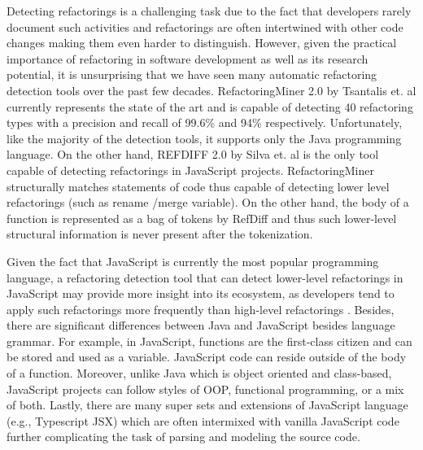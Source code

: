 \documentclass[letterpaper,12pt,onecolumn,final]{report}
\begin{document}
Detecting refactorings is a challenging task due to the fact that developers rarely document such activities \cite{alomar2021refactoring} and refactorings are often intertwined with other code changes making them even harder to distinguish. However, given the practical importance of refactoring in software development as well as its research potential, it is unsurprising that we have seen many automatic refactoring detection tools over the past few decades. RefactoringMiner 2.0 by Tsantalis et. al \cite{Tsantalis2020} currently represents the state of the art and is capable of detecting 40 refactoring types with a precision and recall of 99.6\% and 94\% respectively.  Unfortunately, like the majority of the detection tools, it supports only the Java programming language. On the other hand, REFDIFF 2.0 by Silva et. al  \cite{Silva2020} is the only tool capable of detecting refactorings in JavaScript projects. RefactoringMiner structurally matches statements of code thus capable of detecting lower level refactorings (such as rename /merge variable). On the other hand, the body of a function is represented as a bag of tokens by RefDiff and thus such lower-level structural information is never present after the tokenization.

Given the fact that JavaScript is currently the most popular programming language, a refactoring detection tool that can detect lower-level refactorings in JavaScript may provide more insight into its ecosystem, as developers tend to apply such refactorings more frequently than high-level refactorings \cite{MurphyHill2012}. Besides, there are significant differences between Java and JavaScript besides language grammar. For example, in JavaScript, functions are the first-class citizen and can be stored and used as a variable. JavaScript code can reside outside of the body of a function. Moreover, unlike Java which is object oriented and class-based, JavaScript projects can follow styles of OOP, functional programming, or a mix of both. Lastly, there are many super sets and extensions of JavaScript language (e.g., Typescript JSX) which are often intermixed with vanilla JavaScript code further complicating the task of parsing and modeling the source code.
\end{document}
